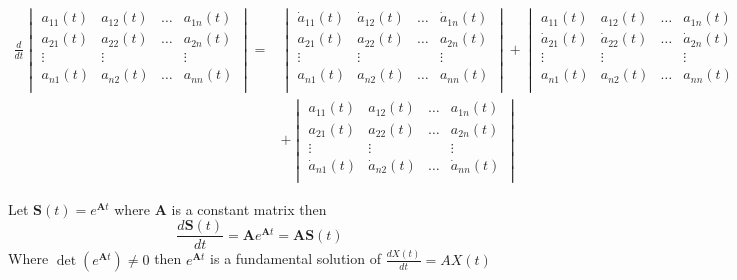 \begin{align*}
    \frac{d}{dt} \begin{vmatrix}
                     a_{11}(t) & a_{12}(t) & \dots & a_{1n}(t) \\
                     a_{21}(t) & a_{22}(t) & \dots & a_{2n}(t) \\
                     \vdots    & \vdots    &       & \vdots    \\
                     a_{n1}(t) & a_{n2}(t) & \dots & a_{nn}(t) \\
                 \end{vmatrix}
    = &
    \begin{vmatrix}
        \dot{a}_{11}(t) & \dot{a}_{12}(t) & \dots & \dot{a}_{1n}(t) \\
        a_{21}(t)       & a_{22}(t)       & \dots & a_{2n}(t)       \\
        \vdots          & \vdots          &       & \vdots          \\
        a_{n1}(t)       & a_{n2}(t)       & \dots & a_{nn}(t)       \\
    \end{vmatrix}
    +
    \begin{vmatrix}
        a_{11}(t)       & a_{12}(t)       & \dots & a_{1n}(t)       \\
        \dot{a}_{21}(t) & \dot{a}_{22}(t) & \dots & \dot{a}_{2n}(t) \\
        \vdots          & \vdots          &       & \vdots          \\
        a_{n1}(t)       & a_{n2}(t)       & \dots & a_{nn}(t)       \\
    \end{vmatrix}
    +
    \dots
    \\
      & +
    \begin{vmatrix}
        a_{11}(t)       & a_{12}(t)       & \dots & a_{1n}(t)       \\
        a_{21}(t)       & a_{22}(t)       & \dots & a_{2n}(t)       \\
        \vdots          & \vdots          &       & \vdots          \\
        \dot{a}_{n1}(t) & \dot{a}_{n2}(t) & \dots & \dot{a}_{nn}(t) \\
    \end{vmatrix}
\end{align*}
\begin{lemma}
    Let $\displaystyle \mathbf{S}(t) = e^{\mathbf{A}t}$ where $\mathbf{A}$ is a constant matrix then
    \[
        \frac{d\mathbf{S}(t)}{dt} = \mathbf{A}e^{\mathbf{A}t} = \mathbf{A}\mathbf{S}(t)
    \]
    Where $\det(e^{\mathbf{A}t})\neq 0$
    then $e^{\mathbf{A}t}$ is a fundamental solution of $\displaystyle \frac{dX(t)}{dt} = AX(t)$    
\end{lemma}
